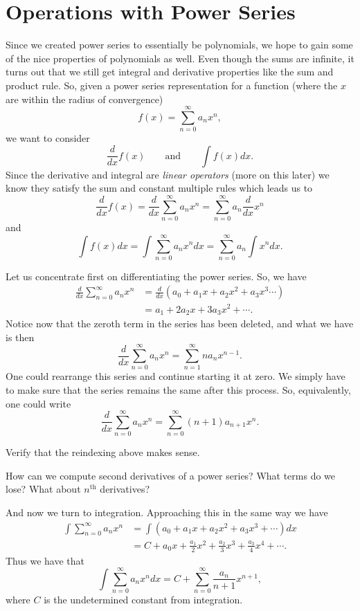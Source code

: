 \section{Operations with Power Series}
Since we created power series to essentially be polynomials, we hope to gain some of the nice properties of polynomials as well.  Even though the sums are infinite, it turns out that we still get integral and derivative properties like the sum and product rule.  So, given a power series representation for a function (where the $x$ are within the radius of convergence)
\[
f(x)=\sum_{n=0}^\infty a_n x^n,
\]
we want to consider
\[
\frac{d}{dx} f(x) \qquad \textrm{and} \qquad \int f(x) dx.
\]
Since the derivative and integral are \emph{linear operators} (more on this later) we know they satisfy the sum and constant multiple rules which leads us to
\[
\frac{d}{dx} f(x) = \frac{d}{dx} \sum_{n=0}^\infty a_n x^n = \sum_{n=0}^\infty a_n \frac{d}{dx} x^n
\]
and
\[
\int f(x) dx = \int \sum_{n=0}^\infty a_nx^n dx = \sum_{n=0}^\infty a_n \int x^n dx.
\]

Let us concentrate first on differentiating the power series.  So, we have 
\begin{align*}
\frac{d}{dx} \sum_{n=0}^\infty a_nx^n&=\frac{d}{dx} \left(a_0 + a_1x + a_2 x^2 + a_3 x^3 \cdots\right)\\
&= a_1 + 2a_2x+3a_3x^2+\cdots.
\end{align*}
Notice now that the zeroth term in the series has been deleted, and what we have is then
\[
\boxed{\frac{d}{dx} \sum_{n=0}^\infty a_n x^n = \sum_{n=1}^\infty na_n x^{n-1}.}
\]
One could rearrange this series and continue starting it at zero.  We simply have to make sure that the series remains the same after this process.  So, equivalently, one could write
\[
\frac{d}{dx} \sum_{n=0}^\infty a_n x^n = \sum_{n=0}^\infty (n+1)a_{n+1} x^n.
\]

\begin{exercise}
    Verify that the reindexing above makes sense.  
\end{exercise}

\begin{exercise}
    How can we compute second derivatives of a power series? What terms do we lose? What about $n^\textrm{th}$ derivatives?
\end{exercise}

And now we turn to integration. Approaching this in the same way we have
\begin{align*}
    \int \sum_{n=0}^\infty a_n x^n &= \int \left( a_0 +a_1x+a_2x^2+a_3x^3+\cdots\right)dx\\
    &= C+a_0x+\frac{a_1}{2}x^2+\frac{a_2}{3}x^3+\frac{a_3}{4}x^4+\cdots.
\end{align*}
Thus we have that
\[
\boxed{\int \sum_{n=0}^\infty a_n x^n dx = C + \sum_{n=0}^\infty \frac{a_n}{n+1} x^{n+1},}
\]
where $C$ is the undetermined constant from integration.

